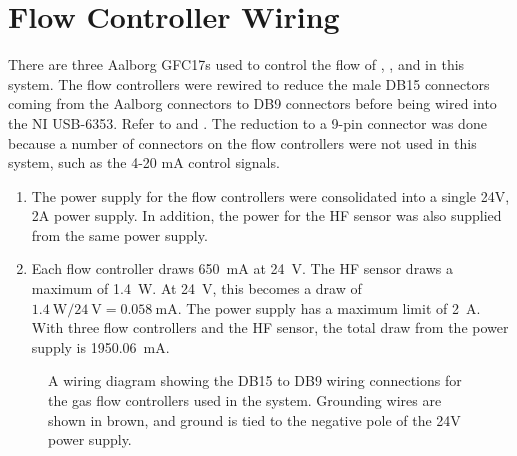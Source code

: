 %
%

\section{Flow Controller Wiring}

There are three Aalborg GFC17s used to control the flow of , ,
and  in this system. The flow controllers were rewired to reduce the male
DB15 connectors coming
from the Aalborg connectors to DB9 connectors before being
wired into the NI USB-6353. Refer to  and . The reduction to a
9-pin connector was
done because a number of connectors on the flow controllers were not used
in this system, such as the 4-20 mA control signals. \par

\begin{enumerate}
  \item The power supply for the flow controllers were consolidated
    into a single 24V, 2A
    power supply. In addition, the power for the HF sensor was also
    supplied from the same
    power supply.
  \item Each flow controller draws \SI{650}{\milli\ampere} at
    \SI{24}{\volt}. The HF sensor draws a
    maximum of \SI{1.4}{\watt}. At \SI{24}{\volt}, this becomes a
    draw of $\SI{1.4}{\watt} / \SI{24}{\volt}  = \SI{0.058}{\milli\ampere}$.
    The power supply has a maximum limit of \SI{2}{\ampere}. With three
    flow controllers and the HF sensor, the total draw from the power supply
    is \SI{1950.06}{\milli\ampere}.
\end{enumerate}

\begin{figure}[H]
  \centering
  
  \caption{A wiring diagram showing the DB15 to DB9 wiring connections for the
    gas flow controllers used in the system. Grounding wires are
    shown in brown, and ground is tied to the negative pole of the
  24V power supply.}
  \label{fig: DB15 to DB9 connector diagram}
\end{figure}

